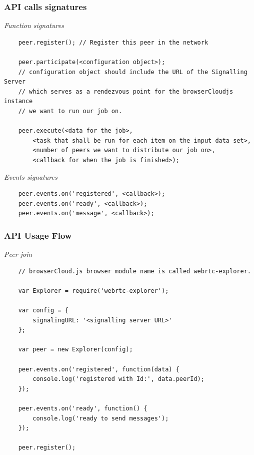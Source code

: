 \subsubsection{API calls signatures}

\textit{Function signatures}
\begingroup
\scriptsize
\begin{verbatim}
    peer.register(); // Register this peer in the network

    peer.participate(<configuration object>);
    // configuration object should include the URL of the Signalling Server
    // which serves as a rendezvous point for the browserCloudjs instance 
    // we want to run our job on.

    peer.execute(<data for the job>, 
        <task that shall be run for each item on the input data set>,
        <number of peers we want to distribute our job on>,
        <callback for when the job is finished>);

\end{verbatim}
\endgroup

\textit{Events signatures}
\begingroup
\scriptsize
\begin{verbatim}
    peer.events.on('registered', <callback>);
    peer.events.on('ready', <callback>);
    peer.events.on('message', <callback>);

\end{verbatim}
\endgroup

\subsubsection{API Usage Flow}

\textit{Peer join}
\begingroup
\scriptsize
\begin{verbatim}
    // browserCloud.js browser module name is called webrtc-explorer.

    var Explorer = require('webrtc-explorer');

    var config = {
        signalingURL: '<signalling server URL>'
    };

    var peer = new Explorer(config);

    peer.events.on('registered', function(data) {
        console.log('registered with Id:', data.peerId);
    });

    peer.events.on('ready', function() {
        console.log('ready to send messages');
    });

    peer.register();
\end{verbatim}
\endgroup

